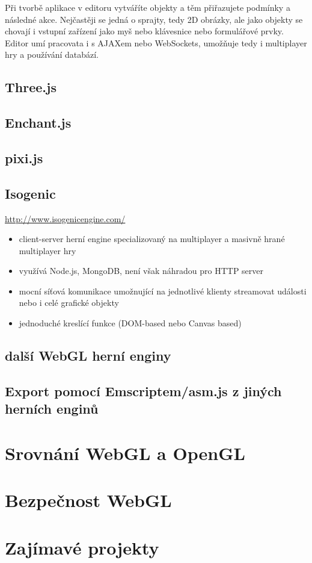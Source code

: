 \documentclass[12pt,a4paper,titlepage,final]{report}
\begin{document}
Při tvorbě aplikace v editoru vytváříte objekty a těm přiřazujete podmínky a následné akce. Nejčastěji se jedná o sprajty, tedy 2D obrázky, ale jako objekty se chovají i vstupní zařízení jako myš nebo klávesnice nebo formulářové prvky. Editor umí pracovata i s AJAXem nebo WebSockets, umožňuje tedy i multiplayer hry a používání databází.

\subsection{Three.js}

\subsection{Enchant.js}

\subsection{pixi.js}

\subsection{Isogenic}

\url{http://www.isogenicengine.com/}

\begin{itemize}
	\item client-server herní engine specializovaný na multiplayer a masivně hrané multiplayer hry
	\item využívá Node.js, MongoDB, není však náhradou pro HTTP server
	\item mocní síťová komunikace umožnující na jednotlivé klienty streamovat události nebo i celé grafické objekty
	\item jednoduché kreslící funkce (DOM-based nebo Canvas based)
\end{itemize}

\subsection{další WebGL herní enginy}

\subsection{Export pomocí Emscriptem/asm.js z jiných herních enginů}

\section{Srovnání WebGL a OpenGL}

\section{Bezpečnost WebGL}

\section{Zajímavé projekty}




\nocite{cite1}

\hypertarget{bib}{}

\end{document}
